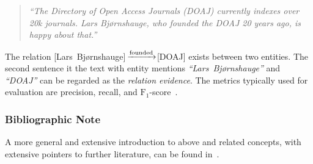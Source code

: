 \begin{quote}
\textit{``The Directory of Open Access Journals (DOAJ) currently indexes over 20k journals. Lars Bj{\o}rnshauge, who founded the DOAJ 20 years ago, is happy about that.''}
\end{quote}

The relation [Lars~Bj{\o}rnshauge]\,$\xrightarrow[]{\text{\texttt\tiny founded}}$[DOAJ] exists between two entities. The second sentence it the text with entity mentions \textit{``Lars~Bj{\o}rnshauge''} and \textit{``DOAJ''} can be regarded as the \emph{relation evidence}. The metrics typically used for evaluation are precision, recall, and $\text{F}_1$-score~\cite{Nasar2021}.

\subsubsection{Bibliographic Note}

A more general and extensive introduction to above and related concepts, with extensive pointers to further literature, can be found in~\cite{Aggarwal2018}.

